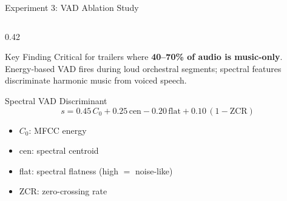\documentclass[aspectratio=169]{beamer}
\begin{document}
\begin{frame}{Experiment 3: VAD Ablation Study}
\begin{columns}[T]
\begin{column}{0.42\textwidth}
\begin{block}{Key Finding}
        Critical for trailers where \textbf{40--70\% of audio is music-only}. Energy-based VAD fires during loud orchestral segments; spectral features discriminate harmonic music from voiced speech.
      \end{block}
      \begin{block}{Spectral VAD Discriminant}
        \vspace{-0.2cm}
        \[
          s = 0.45\,C_0 + 0.25\,\mathrm{cen} - 0.20\,\mathrm{flat} + 0.10\,(1-\mathrm{ZCR})
        \]
        \vspace{-0.3cm}
        \begin{itemize}
          \item $C_0$: MFCC energy
          \item cen: spectral centroid
          \item flat: spectral flatness (high $=$ noise-like)
          \item ZCR: zero-crossing rate
        \end{itemize}
      \end{block}
    \end{column}
  \end{columns}
\end{frame}
\end{document}
